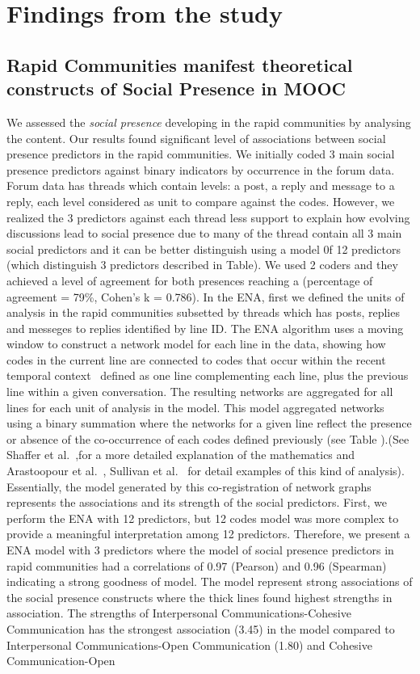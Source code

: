\documentclass[manuscript,screen,review]{acmart}
\begin{document}
\section{Findings from the study}

\subsection{Rapid Communities manifest theoretical constructs of Social Presence in MOOC}
We assessed the \textit{social presence} developing in the rapid communities by analysing the content. Our results found significant level of associations between social presence predictors in the rapid communities. We initially coded 3 main social presence predictors against binary indicators by occurrence in the forum data. Forum data has threads which contain levels: a post, a reply and message to a reply, each level considered as unit to compare against the codes. However, we realized the 3 predictors against each thread less support to explain how evolving discussions lead to social presence due to many of the thread contain all 3 main social predictors and it can be better distinguish using a model 0f 12 predictors (which distinguish 3 predictors described in Table). We used 2 coders and they achieved a level of agreement for both presences reaching a (percentage of agreement = 79\%, Cohen's k = 0.786). In the ENA, first we defined the units of analysis in the rapid communities subsetted by threads which has posts, replies and messeges to replies identified by line ID. The ENA algorithm uses a moving window to construct a network model for each line in the data, showing how codes in the current line are connected to codes that occur within the recent temporal context~\cite{siebert2017search} defined as one line complementing each line, plus the previous line within a given conversation. The resulting networks are aggregated for all lines for each unit of analysis in the model. This model aggregated networks using a binary summation where the networks for a given line reflect the presence or absence of the co-occurrence of each codes defined previously (see Table ).(See  Shaffer et al.~\cite{shaffer2016tutorial},for a more detailed explanation of the mathematics and Arastoopour et al.~\cite{arastoopour2015epistemic}, Sullivan et al.~\cite{sullivan2018using} for detail examples of this kind of analysis). Essentially, the model generated by this co-registration of network graphs represents  the associations and its strength of the social predictors. First, we perform the ENA with 12 predictors, but 12 codes model was more complex to provide a meaningful interpretation among 12 predictors. Therefore, we present a ENA model with 3 predictors where the model of social presence predictors in rapid communities had a correlations of 0.97 (Pearson) and 0.96 (Spearman) indicating a strong goodness of model. The model represent strong associations of the social presence constructs where the thick lines found highest strengths in association. The strengths of Interpersonal Communications-Cohesive Communication has the strongest association (3.45) in the model compared to Interpersonal Communications-Open Communication (1.80) and Cohesive Communication-Open 
\end{document}
